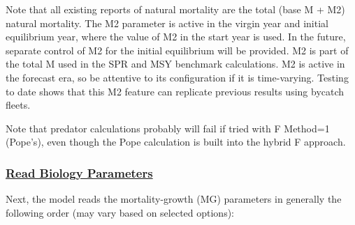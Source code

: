 Note that all existing reports of natural mortality are the total (base M + M2) natural mortality. The M2 parameter is active in the virgin year and initial equilibrium year, where the value of M2 in the start year is used. In the future, separate control of M2 for the initial equilibrium will be provided. M2 is part of the total M used in the SPR and MSY benchmark calculations. M2 is active in the forecast era, so be attentive to its configuration if it is time-varying. Testing to date shows that this M2 feature can replicate previous results using bycatch fleets.

Note that predator calculations probably will fail if tried with F Method=1 (Pope's), even though the Pope calculation is built into the hybrid F approach.

\hypertarget{ReadBioParams}{}
\subsubsection[Read Biology Parameters]{\protect\hyperlink{ReadBioParams}{Read Biology Parameters}}
\hypertarget{MGorder}{}
Next, the model reads the mortality-growth (MG) parameters in generally the following order (may vary based on selected options):

